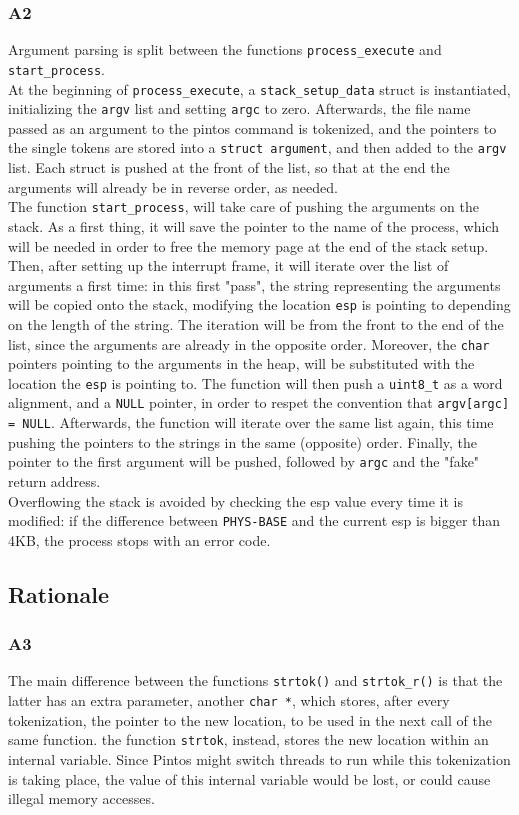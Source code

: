 \documentclass[a4wide, 11pt]{article}
\newcommand{\tx}{\texttt}
\begin{document}
\subsubsection{A2}
Argument parsing is split between the functions \tx{process\_execute} and \tx{start\_process}. \\
At the beginning of \tx{process\_execute}, a \tx{stack\_setup\_data} struct is instantiated, initializing the \tx{argv} list and setting \tx{argc} to zero. Afterwards, the file name passed as an argument to the pintos command is tokenized, and the pointers to the single tokens are stored into a \tx{struct argument}, and then added to the \tx{argv} list. Each struct is pushed at the front of the list, so that at the end the arguments will already be in reverse order, as needed. \\
The function \tx{start\_process}, will take care of pushing the arguments on the stack. As a first thing, it will save the pointer to the name of the process, which will be needed in order to free the memory page at the end of the stack setup. Then, after setting up the interrupt frame, it will iterate over the list of arguments a first time: in this first "pass", the string representing the arguments will be copied onto the stack, modifying the location \tx{esp} is pointing to depending on the length of the string. The iteration will be from the front to the end of the list, since the arguments are already in the opposite order. Moreover, the \tx{char} pointers pointing to the arguments in the heap, will be substituted with the location the \tx{esp} is pointing to. The function will then push a \tx{uint8\_t} as a word alignment, and a \tx{NULL} pointer, in order to respet the convention that \tx{argv[argc] = NULL}. Afterwards, the function will iterate over the same list again, this time pushing the pointers to the strings in the same (opposite) order. Finally, the pointer to the first argument will be pushed, followed by \tx{argc} and the "fake" return address. \\
Overflowing the stack is avoided by checking the esp value every time it is modified: if the difference between \tx{PHYS-BASE} and the current esp is bigger than 4KB, the process stops with an error code.   

\subsection{Rationale}
\subsubsection{A3}
The main difference between the functions \tx{strtok()} and \tx{strtok\_r()} is that the latter has an extra parameter, another \tx{char *}, which stores, after every tokenization, the pointer to the new location, to be used in the next call of the same function. the function \tx{strtok}, instead, stores the new location within an internal variable. Since Pintos might switch threads to run while this tokenization is taking place, the value of this internal variable would be lost, or could cause illegal memory accesses.
\end{document}
